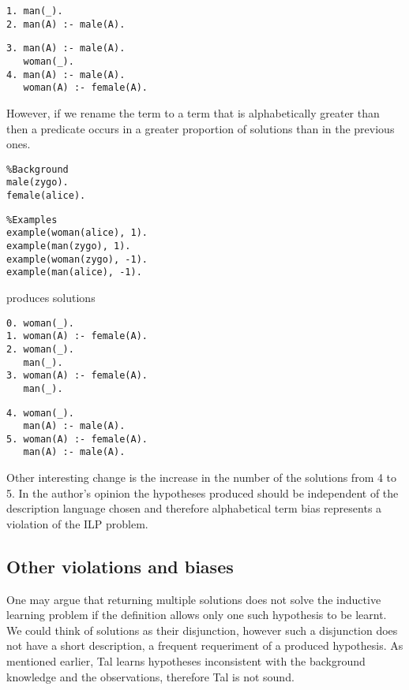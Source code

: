 \begin{minipage}[t]{.50\textwidth}
\begin{lstlisting}
1. man(_).
2. man(A) :- male(A).
\end{lstlisting}
\end{minipage}
\begin{minipage}[t]{.20\textwidth}
\begin{lstlisting}
3. man(A) :- male(A).
   woman(_).
4. man(A) :- male(A).
   woman(A) :- female(A).
\end{lstlisting}
\end{minipage}

However, if we rename the term  to a term that is alphabetically greater than  then a predicate  occurs in a greater proportion of solutions than in the previous ones.

\begin{minipage}[t]{.50\textwidth}
\begin{lstlisting}
%Background
male(zygo).
female(alice).
\end{lstlisting}
\end{minipage}
\begin{minipage}[t]{.20\textwidth}
\begin{lstlisting}
%Examples
example(woman(alice), 1).
example(man(zygo), 1).
example(woman(zygo), -1).
example(man(alice), -1).
\end{lstlisting}
\end{minipage}

produces solutions

\begin{minipage}[t]{.50\textwidth}
\begin{lstlisting}
0. woman(_).
1. woman(A) :- female(A).
2. woman(_).
   man(_).
3. woman(A) :- female(A).
   man(_).
\end{lstlisting}
\end{minipage}
\begin{minipage}[t]{.20\textwidth}
\begin{lstlisting}
4. woman(_).
   man(A) :- male(A).
5. woman(A) :- female(A).
   man(A) :- male(A).
\end{lstlisting}
\end{minipage}

Other interesting change is the increase in the number of the solutions from 4 to 5. In the author's opinion the hypotheses produced should be independent of the description language chosen and therefore alphabetical term bias represents a violation of the ILP problem.

\subsection{Other violations and biases}
One may argue that returning multiple solutions does not solve the inductive learning problem if the definition allows only one such hypothesis to be learnt. We could think of solutions as their disjunction, however such a disjunction does not have a short description, a frequent requeriment of a produced hypothesis. As mentioned earlier, Tal learns hypotheses inconsistent with the background knowledge and the observations, therefore Tal is not sound.
